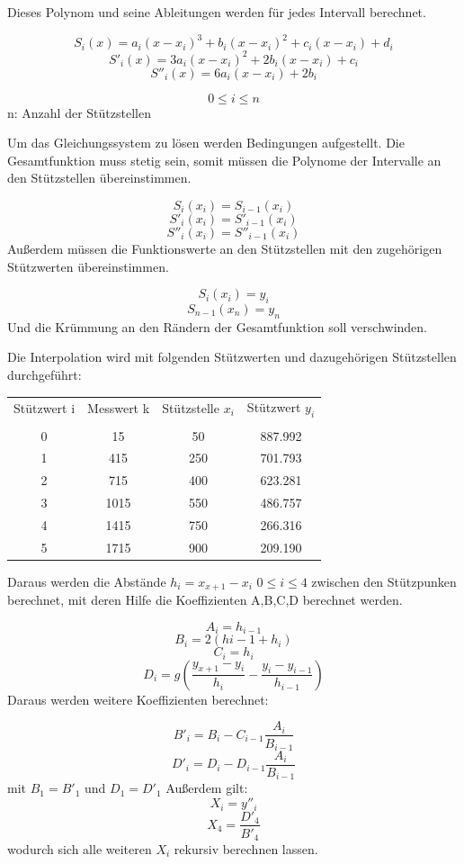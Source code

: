 \documentclass{scrreprt}
\begin{document}
Dieses Polynom und seine Ableitungen werden für jedes Intervall berechnet.

\[S_i(x)=a_i(x-x_i)^3+b_i(x-x_i)^2+c_i(x-x_i)+d_i\]
\[S'_i(x)=3a_i(x-x_i)^2+2b_i(x-x_i)+c_i\]
\[S''_i(x)=6a_i(x-x_i)+2b_i\]

\[0 \leq i \leq n\]
n: Anzahl der Stützstellen

Um das Gleichungssystem zu lösen werden Bedingungen aufgestellt.
Die Gesamtfunktion muss stetig sein, somit müssen die Polynome der Intervalle an den Stützstellen übereinstimmen.

\[S_i(x_i)=S_{i-1}(x_i)\]
\[S'_i(x_i)=S'_{i-1}(x_i)\]
\[S''_i(x_i)=S''_{i-1}(x_i)\]
Außerdem müssen die Funktionswerte an den Stützstellen mit den zugehörigen Stützwerten übereinstimmen.

\[S_i(x_i)=y_i\]
\[S_{n-1}(x_n)=y_n\]
Und die Krümmung an den Rändern der Gesamtfunktion soll verschwinden.

Die Interpolation wird mit folgenden Stützwerten und dazugehörigen Stützstellen durchgeführt:

\begin{center}
		\begin{tabular}{cccc}
			Stützwert i & Messwert k & Stützstelle $x_i$ & Stützwert $y_i$\\
			\\
			0 & 15 & 50 & 887.992\\
			1 & 415 & 250 & 701.793\\
			2 & 715 & 400 & 623.281\\
			3 & 1015 & 550 & 486.757\\
			4 & 1415 & 750 & 266.316\\
			5 & 1715 & 900 & 209.190\\
		\end{tabular}
\end{center}

Daraus werden die Abstände $h_i=x_{x+1}-x_i$ $0 \leq i \leq 4$ zwischen den Stützpunken berechnet, mit deren Hilfe die Koeffizienten A,B,C,D berechnet werden.

\[A_i = h_{i-1}\]
\[B_i = 2(h{i-1}+h_i)\]
\[C_i = h_i\]
\[D_i = g(\frac{y_{x+1}-y_i}{h_i}-\frac{y_i-y_{i-1}}{h_{i-1}})\]
Daraus werden weitere Koeffizienten berechnet:


\[B'_i = B_i-C_{i-1}\frac{A_i}{B_{i-1}}\]
\[D'_i = D_i-D_{i-1}\frac{A_i}{B_{i-1}}\]
mit $B_1=B'_1$ und $D_1=D'_1$
Außerdem gilt:
\[X_i=y''_i\]
\[X_4 = \frac{D'_4}{B'_4}\]
wodurch sich alle weiteren $X_i$ rekursiv berechnen lassen.
\end{document}
